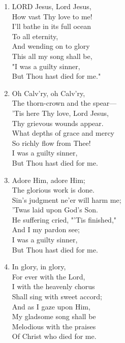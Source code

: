 \begin{enumerate}
    \item LORD Jesus, Lord Jesus, \\
            How vast Thy love to me! \\
        I'll bathe in its full ocean \\
            To all eternity, \\
        And wending on to glory \\
            This all my song shall be, \\
        "I was a guilty sinner, \\
            But Thou hast died for me."

    \item Oh Calv'ry, oh Calv'ry, \\
            The thorn-crown and the spear--- \\
        'Tis here Thy love, Lord Jesus, \\
            Thy grievous wounds appear. \\
        What depths of grace and mercy \\
            So richly flow from Thee! \\
        I was a guilty sinner, \\
            But Thou hast died for me.

    \item Adore Him, adore Him; \\
            The glorious work is done. \\
        Sin's judgment ne'er will harm me; \\
            'Twas laid upon God's Son. \\
        He suffering cried, "'Tis finished," \\
            And I my pardon see; \\
        I was a guilty sinner, \\
            But Thou hast died for me.

    \item In glory, in glory, \\
            For ever with the Lord, \\
        I with the heavenly chorus \\
            Shall sing with sweet accord; \\
        And as I gaze upon Him, \\
            My gladsome song shall be \\
        Melodious with the praises \\
            Of Christ who died for me.

\end{enumerate}

